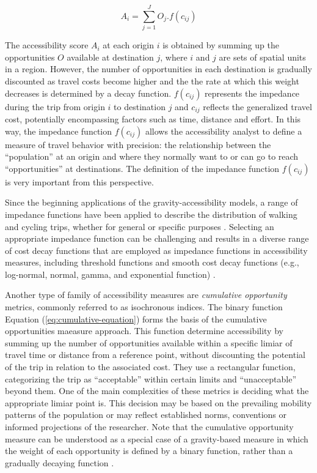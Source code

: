 \documentclass[preprint, 3p,
authoryear]{elsarticle} %
\begin{document}
\begin{equation}
A_{i} = \sum_{j=1}^J O_j .f(c_{ij})
\label{eq:accessibility-equation}
\end{equation}

The accessibility score \(A_{i}\) at each origin \(i\) is obtained by
summing up the opportunities \(O\) available at destination \(j\), where
\(i\) and \(j\) are sets of spatial units in a region. However, the
number of opportunities in each destination is gradually discounted as
travel costs become higher and the the rate at which this weight
decreases is determined by a decay function. \(f(c_{ij})\) represents
the impedance during the trip from origin \(i\) to destination \(j\) and
\(c_{ij}\) reflects the generalized travel cost, potentially
encompassing factors such as time, distance and effort. In this way, the
impedance function \(f(c_{ij})\) allows the accessibility analyst to
define a measure of travel behavior with precision: the relationship
between the ``population'' at an origin and where they normally want to
or can go to reach ``opportunities'' at destinations. The definition of
the impedance function \(f(c_{ij})\) is very important from this
perspective.

Since the beginning applications of the gravity-accessibility models, a
range of impedance functions have been applied to describe the
distribution of walking and cycling trips, whether for general or
specific purposes
\citep{iacono2008access, iacono2010, larsen2010, yang2012walking, millward2013active, vale2017influence, li2020approach}.
Selecting an appropriate impedance function can be challenging and
results in a diverse range of cost decay functions that are employed as
impedance functions in accessibility measures, including threshold
functions and smooth cost decay functions (e.g., log-normal, normal,
gamma, and exponential function)
\citep{de2009exponential, reggiani2011accessibility, osth2016new}.

Another type of family of accessibility measures are \emph{cumulative
opportunity} metrics, commonly referred to as isochronous indices. The
binary function Equation (\ref{eq:cumulative-equation}) forms the basis
of the cumulative opportunities maeasure approach. This function
determine accessibility by summing up the number of opportunities
available within a specific limiar of travel time or distance from a
reference point, without discounting the potential of the trip in
relation to the associated cost. They use a rectangular function,
categorizing the trip as ``acceptable'' within certain limits and
``unacceptable'' beyond them. One of the main complexities of these
metrics is deciding what the appropriate limiar point is. This decision
may be based on the prevailing mobility patterns of the population or
may reflect established norms, conventions or informed projections of
the researcher. Note that the cumulative opportunity measure can be
understood as a special case of a gravity-based measure in which the
weight of each opportunity is defined by a binary function, rather than
a gradually decaying function \citep{pereira2023}.
\end{document}
